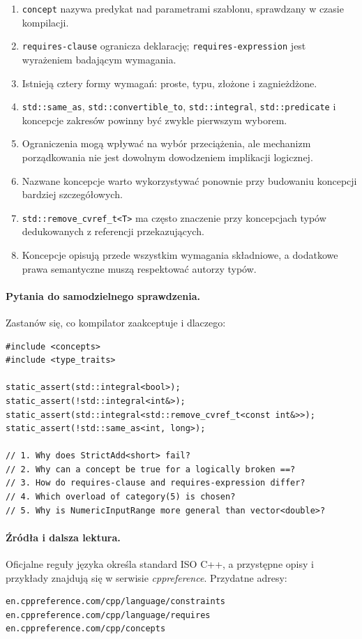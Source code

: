 \begin{enumerate}
\item \texttt{concept} nazywa predykat nad parametrami szablonu,
sprawdzany w czasie kompilacji.
\item \texttt{requires-clause} ogranicza deklarację;
\texttt{requires-expression} jest wyrażeniem badającym wymagania.
\item Istnieją cztery formy wymagań: proste, typu, złożone
i zagnieżdżone.
\item \texttt{std::same\_as}, \texttt{std::convertible\_to},
\texttt{std::integral}, \texttt{std::predicate} i koncepcje zakresów
powinny być zwykle pierwszym wyborem.
\item Ograniczenia mogą wpływać na wybór przeciążenia, ale mechanizm
porządkowania nie jest dowolnym dowodzeniem implikacji logicznej.
\item Nazwane koncepcje warto wykorzystywać ponownie przy
budowaniu koncepcji bardziej szczegółowych.
\item \texttt{std::remove\_cvref\_t<T>} ma często znaczenie
przy koncepcjach typów dedukowanych z referencji przekazujących.
\item Koncepcje opisują przede wszystkim wymagania składniowe,
a dodatkowe prawa semantyczne muszą respektować autorzy typów.
\end{enumerate}

\paragraph{Pytania do samodzielnego sprawdzenia.}
Zastanów się, co kompilator zaakceptuje i dlaczego:

\begin{lstlisting}
#include <concepts>
#include <type_traits>

static_assert(std::integral<bool>);
static_assert(!std::integral<int&>);
static_assert(std::integral<std::remove_cvref_t<const int&>>);
static_assert(!std::same_as<int, long>);

// 1. Why does StrictAdd<short> fail?
// 2. Why can a concept be true for a logically broken ==?
// 3. How do requires-clause and requires-expression differ?
// 4. Which overload of category(5) is chosen?
// 5. Why is NumericInputRange more general than vector<double>?
\end{lstlisting}

\paragraph{Źródła i dalsza lektura.}
Oficjalne reguły języka określa standard ISO C++, a przystępne
opisy i przykłady znajdują się w serwisie \emph{cppreference}.
Przydatne adresy:
\begin{lstlisting}
en.cppreference.com/cpp/language/constraints
en.cppreference.com/cpp/language/requires
en.cppreference.com/cpp/concepts
\end{lstlisting}

